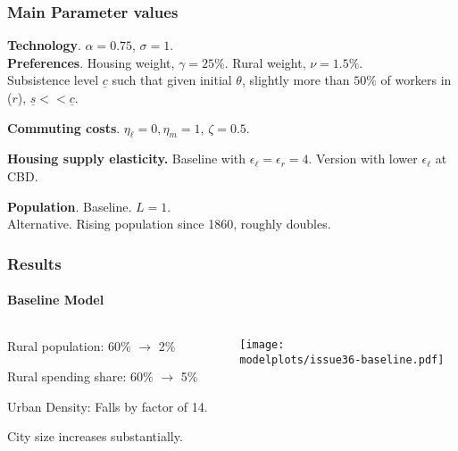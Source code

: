 \documentclass[aspectratio=169]{beamer}
\begin{document}
\begin{frame}
\frametitle{Main Parameter values}

\noindent \textbf{Technology}. $\alpha=0.75$, $\sigma=1$.\\
\medskip
\noindent \textbf{Preferences}. Housing weight, $\gamma=25\%$. Rural weight, $\nu=1.5\%$.\\
Subsistence level $\underline{c}$ such that given initial $\theta$, slightly more than $50\%$ of workers in ($r$), $\underline{s} << \underline{c}$.

\medskip
\noindent \textbf{Commuting costs}. $\eta_\ell=0, \eta_m=1$, $\zeta = 0.5$.

\medskip
\noindent \textbf{Housing supply elasticity.} Baseline with $\epsilon_{\ell} = \epsilon_r=4$. Version with lower $\epsilon_{\ell}$ at CBD.

\medskip
\noindent \textbf{Population}. Baseline. $L=1$.\\
Alternative. Rising population since 1860, roughly doubles.
\end{frame}

\begin{frame}[label=res_laborland]
\frametitle{Results}
\framesubtitle{Baseline Model}

\begin{columns}
\begin{column}{0.3\textwidth}
\begin{mide}
\item Rural population: 60\% $\rightarrow$ 2\%
\item Rural spending share: 60\% $\rightarrow$ 5\%
\item Urban Density: Falls by factor of 14.
\item City size increases substantially.
\end{mide}
\end{column}
\begin{column}{0.7\textwidth}
\begin{adjustbox}{center}
\texttt{[image: \\modelplots/issue36-baseline.pdf]}\end{adjustbox}
\end{column}\end{columns}
\end{frame}
\end{document}
